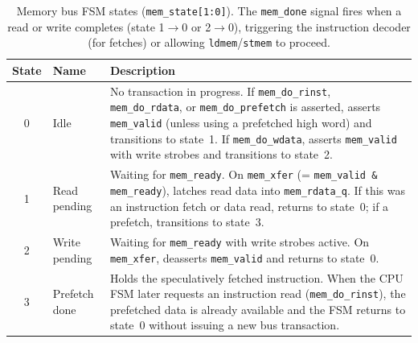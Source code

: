 \documentclass[9pt, a4paper]{extarticle}
\begin{document}
\begin{table}[htbp]
\centering\small
\renewcommand{\arraystretch}{1.25}
\begin{tabular}{@{}c l p{8.5cm}@{}}
    \toprule
    State & Name & Description \\
    \midrule
    0 & Idle & No transaction in progress. If \texttt{mem\_do\_rinst}, \texttt{mem\_do\_rdata}, or \texttt{mem\_do\_prefetch} is asserted, asserts \texttt{mem\_valid} (unless using a prefetched high word) and transitions to state~1. If \texttt{mem\_do\_wdata}, asserts \texttt{mem\_valid} with write strobes and transitions to state~2. \\
    1 & Read pending & Waiting for \texttt{mem\_ready}. On \texttt{mem\_xfer} (= \texttt{mem\_valid \& mem\_ready}), latches read data into \texttt{mem\_rdata\_q}. If this was an instruction fetch or data read, returns to state~0; if a prefetch, transitions to state~3.\footnotemark{} \\
    2 & Write pending & Waiting for \texttt{mem\_ready} with write strobes active. On \texttt{mem\_xfer}, deasserts \texttt{mem\_valid} and returns to state~0. \\
    3 & Prefetch done & Holds the speculatively fetched instruction. When the CPU FSM later requests an instruction read (\texttt{mem\_do\_rinst}), the prefetched data is already available and the FSM returns to state~0 without issuing a new bus transaction. \\
    \bottomrule
\end{tabular}
\caption{Memory bus FSM states (\texttt{mem\_state[1:0]}). The \texttt{mem\_done} signal fires when a read or write completes (state 1$\to$0 or 2$\to$0), triggering the instruction decoder (for fetches) or allowing \texttt{ldmem}/\texttt{stmem} to proceed.}
\label{tab:mem-fsm}
\end{table}
\end{document}
